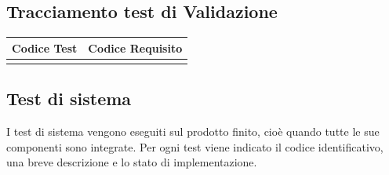 \documentclass[../PianoDiQualifica.tex]{subfiles}
\begin{document}
	\subsection{Tracciamento test di Validazione}
	\begin{longtabu} to \textwidth {
			X[4,l,p]
			X[8,l,p]}
		\toprule
		 Codice Test & Codice Requisito \\
		\midrule
		\endhead
		\addlinespace[0.4em]
		\bottomrule
	\end{longtabu}

	\subsection{Test di sistema} 
	I test di sistema vengono eseguiti sul prodotto finito, cioè quando tutte le sue componenti 
	sono integrate.  
	Per ogni test viene indicato il codice identificativo, una breve descrizione e lo stato di implementazione. 
	
\end{document}
